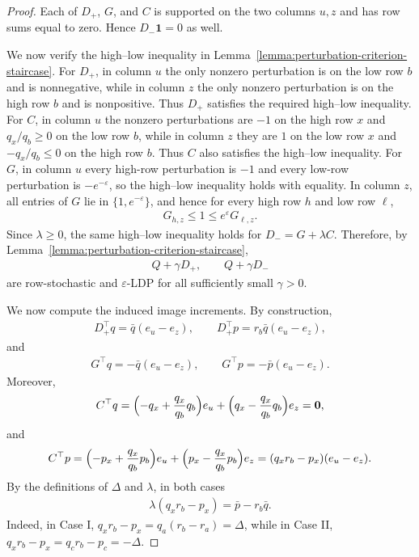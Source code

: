 \documentclass[10pt,a4paper]{amsart}
\begin{document}
\begin{proof}
Each of $D_+$, $G$, and $C$ is supported on the two columns $u,z$ and has row sums equal to zero. Hence $D_-\mathbf 1=0$ as well.

We now verify the high--low inequality in Lemma~\ref{lemma:perturbation-criterion-staircase}. For $D_+$, in column $u$ the only nonzero perturbation is on the low row $b$ and is nonnegative, while in column $z$ the only nonzero perturbation is on the high row $b$ and is nonpositive. Thus $D_+$ satisfies the required high--low inequality. For $C$, in column $u$ the nonzero perturbations are $-1$ on the high row $x$ and $q_x/q_b\ge 0$ on the low row $b$, while in column $z$ they are $1$ on the low row $x$ and $-q_x/q_b\le 0$ on the high row $b$. Thus $C$ also satisfies the high--low inequality. For $G$, in column $u$ every high-row perturbation is $-1$ and every low-row perturbation is $-e^{-\varepsilon}$, so the high--low inequality holds with equality. In column $z$, all entries of $G$ lie in $\{1,e^{-\varepsilon}\}$, and hence for every high row $h$ and low row $\ell$,
\begin{align*}
    G_{h,z}\le 1 \le e^\varepsilon G_{\ell,z}.
\end{align*}
Since $\lambda\ge 0$, the same high--low inequality holds for $D_-=G+\lambda C$. Therefore, by Lemma~\ref{lemma:perturbation-criterion-staircase},
\begin{align*}
    Q+\gamma D_+,\qquad Q+\gamma D_-
\end{align*}
are row-stochastic and $\varepsilon$-LDP for all sufficiently small $\gamma>0$.

We now compute the induced image increments. By construction,
\begin{align*}
    D_+^\top q=\bar q(e_u-e_z),
    \qquad
    D_+^\top p=r_b\bar q(e_u-e_z),
\end{align*}
and
\begin{align*}
    G^\top q=-\bar q(e_u-e_z),
    \qquad
    G^\top p=-\bar p(e_u-e_z).
\end{align*}
Moreover,
\begin{align*}
    C^\top q=
    \Bigl(-q_x+\frac{q_x}{q_b}q_b\Bigr)e_u
    +
    \Bigl(q_x-\frac{q_x}{q_b}q_b\Bigr)e_z
    =\mathbf 0,
\end{align*}
and
\begin{align*}
    C^\top p=
    \Bigl(-p_x+\frac{q_x}{q_b}p_b\Bigr)e_u
    +
    \Bigl(p_x-\frac{q_x}{q_b}p_b\Bigr)e_z
    =
    (q_xr_b-p_x)(e_u-e_z).
\end{align*}
By the definitions of $\Delta$ and $\lambda$, in both cases
\begin{align*}
    \lambda(q_xr_b-p_x)=\bar p-r_b\bar q.
\end{align*}
Indeed, in Case I, $q_xr_b-p_x=q_a(r_b-r_a)=\Delta$, while in Case II, $q_xr_b-p_x=q_c r_b-p_c=-\Delta$.


\end{proof}
\end{document}

